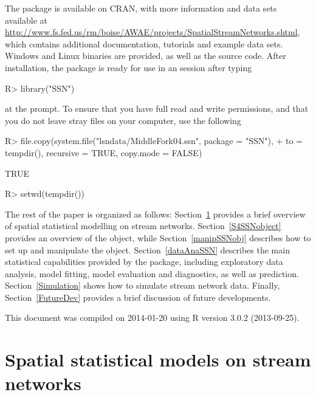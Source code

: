 \documentclass[nojss]{jss}
\renewenvironment{Schunk}{\vspace{\topsep}}{\vspace{\topsep}}
\begin{document}
The  package is available on CRAN, with more information and data sets available at
\url{http://www.fs.fed.us/rm/boise/AWAE/projects/SpatialStreamNetworks.shtml}, which contains additional documentation, tutorials and example data sets. Windows and Linux binaries are provided, as well as the source code. After installation, the package is ready for use in an  session after typing
\begin{Schunk}
\begin{Sinput}
R> library("SSN")
\end{Sinput}
\end{Schunk}
at the  prompt.  To ensure that you have full read and write permissions, and that you do not leave stray files on your computer, use the following
\begin{Schunk}
\begin{Sinput}
R> file.copy(system.file("lsndata/MiddleFork04.ssn", package = "SSN"),
+    to = tempdir(), recursive = TRUE, copy.mode = FALSE)
\end{Sinput}
\begin{Soutput}
[1] TRUE
\end{Soutput}
\begin{Sinput}
R> setwd(tempdir())
\end{Sinput}
\end{Schunk}

The rest of the paper is organized as follows:
Section~\ref{TheoryModels} provides a brief overview of spatial
statistical modelling on stream networks. Section~\ref{S4SSNobject}
provides an overview of the  
object, while Section~\ref{manipSSNobj} describes how to set up and
manipulate the object. Section~\ref{dataAnaSSN} describes the main
statistical capabilities provided by the package, including
exploratory data analysis, model fitting, model evaluation and
diagnostics, as well as prediction. Section~\ref{Simulation} shows how
to simulate stream network data. Finally, Section~\ref{FutureDev}
provides a brief discussion of future developments.

This document was compiled on 2014-01-20 using
R version 3.0.2 (2013-09-25).

%
%

\section{Spatial statistical models on stream networks} \label{TheoryModels}
\end{document}
